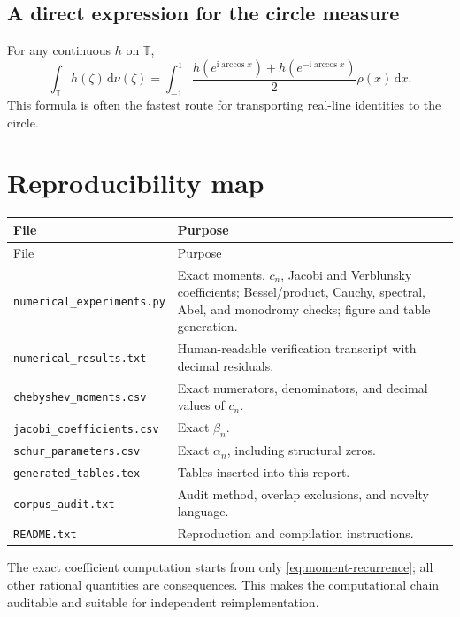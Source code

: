 \documentclass[11pt,oneside]{article}
\theoremstyle{definition}
\newcommand{\dd}{\,\mathrm d}
\newcommand{\ii}{\mathrm i}
\newcommand{\T}{\mathbb T}
\begin{document}
\subsection{A direct expression for the circle measure}

For any continuous \(h\) on \(\T\),
\begin{equation}
 \int_{\T}h(\zeta)\dd\nu(\zeta)
 =\int_{-1}^{1}\frac{h(e^{\ii\arccos x})+h(e^{-\ii\arccos x})}{2}
 \rho(x)\dd x.
 \label{eq:nu-pushforward}
\end{equation}
This formula is often the fastest route for transporting real-line identities to the circle.

\section{Reproducibility map}
\label{app:code}

\begin{longtable}{p{}p{}}
\toprule
File & Purpose\\
\midrule
\endfirsthead
\toprule
File & Purpose\\
\midrule
\endhead
\bottomrule
\endfoot
\texttt{numerical\_experiments.py} & Exact moments, \(c_n\), Jacobi and Verblunsky
coefficients; Bessel/product, Cauchy, spectral, Abel, and monodromy checks; figure and table
generation.\\
\texttt{numerical\_results.txt} & Human-readable verification transcript with decimal
residuals.\\
\texttt{chebyshev\_moments.csv} & Exact numerators, denominators, and decimal values of
\(c_n\).\\
\texttt{jacobi\_coefficients.csv} & Exact \(\beta_n\).\\
\texttt{schur\_parameters.csv} & Exact \(\alpha_n\), including structural zeros.\\
\texttt{generated\_tables.tex} & Tables inserted into this report.\\
\texttt{corpus\_audit.txt} & Audit method, overlap exclusions, and novelty language.\\
\texttt{README.txt} & Reproduction and compilation instructions.\\
\end{longtable}

The exact coefficient computation starts from only \eqref{eq:moment-recurrence}; all other
rational quantities are consequences. This makes the computational chain auditable and
suitable for independent reimplementation.
\end{document}
